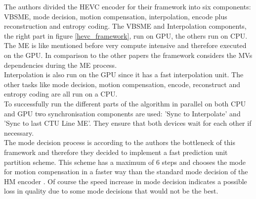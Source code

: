 The authors divided the HEVC encoder for their framework into six components: VBSME, mode decision, motion compensation, interpolation, encode plus reconstruction and
entropy coding. The VBSME and Interpolation components,
the right part in figure \ref{hevc_framework}, run on GPU, the others run on
CPU. \\
The ME is like mentioned before very compute intensive and therefore executed on the GPU. In comparison to the other papers the framework considers the MVs dependencies during the ME process. \\
Interpolation is also run on the GPU since it has a fast interpolation unit. The other tasks like mode decision, motion compensation, encode, reconstruct and entropy coding are all run on a CPU.\\
To successfully run the different parts of the algorithm in parallel on both CPU and GPU two synchronisation components are used: 'Sync to Interpolate' and 'Sync to last CTU Line ME'. They ensure that both devices wait for each other if necessary.\\
The mode decision process is according to the authors the bottleneck of this framework and therefore they decided to implement a fast prediction unit partition scheme. This scheme has a maximum of 6 steps and chooses the mode for motion compensation in a faster way than the standard mode decision of the HM encoder \cite{hmencoder}. Of course the speed increase in 
mode decision indicates a possible loss in quality due to some mode decisions that would not be the best.
